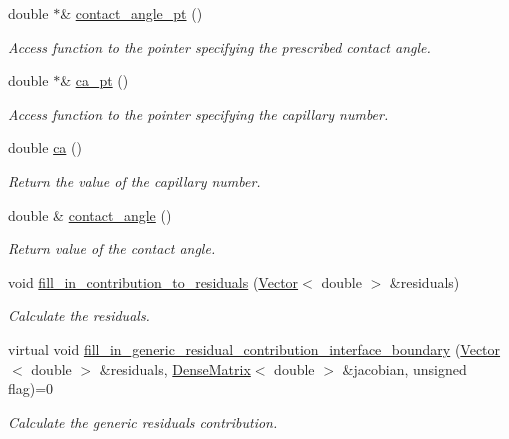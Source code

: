 \begin{DoxyCompactItemize}
double $\ast$\& \hyperlink{classoomph_1_1FluidInterfaceBoundingElement_a00fc3fdc8c3b7d149ba2c6de44f4a150}{contact\+\_\+angle\+\_\+pt} ()
\begin{DoxyCompactList}\small\item\em Access function to the pointer specifying the prescribed contact angle. \end{DoxyCompactList}\item 
double $\ast$\& \hyperlink{classoomph_1_1FluidInterfaceBoundingElement_acf132633ea7ed6b063c1f2a0a62d0b8c}{ca\+\_\+pt} ()
\begin{DoxyCompactList}\small\item\em Access function to the pointer specifying the capillary number. \end{DoxyCompactList}\item 
double \hyperlink{classoomph_1_1FluidInterfaceBoundingElement_ae5d097813762a2544d0b49c6e2fbaaac}{ca} ()
\begin{DoxyCompactList}\small\item\em Return the value of the capillary number. \end{DoxyCompactList}\item 
double \& \hyperlink{classoomph_1_1FluidInterfaceBoundingElement_a6803f4ea8de0b3fe17b703d7489c8147}{contact\+\_\+angle} ()
\begin{DoxyCompactList}\small\item\em Return value of the contact angle. \end{DoxyCompactList}\item 
void \hyperlink{classoomph_1_1FluidInterfaceBoundingElement_acaa709e7a402418fb03f2bf0f57f53ea}{fill\+\_\+in\+\_\+contribution\+\_\+to\+\_\+residuals} (\hyperlink{classoomph_1_1Vector}{Vector}$<$ double $>$ \&residuals)
\begin{DoxyCompactList}\small\item\em Calculate the residuals. \end{DoxyCompactList}\item 
virtual void \hyperlink{classoomph_1_1FluidInterfaceBoundingElement_a69fa099e0cbfe8ae028a4edc77fedc60}{fill\+\_\+in\+\_\+generic\+\_\+residual\+\_\+contribution\+\_\+interface\+\_\+boundary} (\hyperlink{classoomph_1_1Vector}{Vector}$<$ double $>$ \&residuals, \hyperlink{classoomph_1_1DenseMatrix}{Dense\+Matrix}$<$ double $>$ \&jacobian, unsigned flag)=0
\begin{DoxyCompactList}\small\item\em Calculate the generic residuals contribution. \end{DoxyCompactList}\item 

\end{DoxyCompactItemize}
